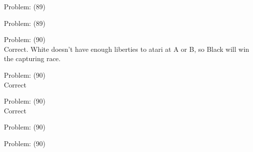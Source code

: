 \documentclass[11pt]{article}
\begin{document}
\begin{minipage}[t]{0.5\textwidth}
  {\centering
  
  Problem: (89)\\
  
  }
\end{minipage}
\begin{minipage}[t]{0.5\textwidth}
  {\centering
  
  Problem: (89)\\
  
  }
\end{minipage}
\begin{minipage}[t]{0.5\textwidth}
  {\centering
  
  Problem: (90)\\
  Correct. White doesn't have enough liberties to atari at A or B, so Black will win the capturing race.\\
  }
\end{minipage}
\begin{minipage}[t]{0.5\textwidth}
  {\centering
  
  Problem: (90)\\
  Correct\\
  }
\end{minipage}
\begin{minipage}[t]{0.5\textwidth}
  {\centering
  
  Problem: (90)\\
  Correct\\
  }
\end{minipage}
\begin{minipage}[t]{0.5\textwidth}
  {\centering
  
  Problem: (90)\\
  
  }
\end{minipage}
\begin{minipage}[t]{0.5\textwidth}
  {\centering
  
  Problem: (90)\\
  
  }
\end{minipage}
\end{document}
